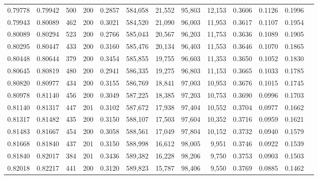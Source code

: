 \begin{tabular}{rrrrrrrrrrrrr}
0.79778 & 0.79942 &   500 & 200 &                                     0.2857 & 584,058 &  21,552 &  95,803 &  12,153 & 0.3606 & 0.1126 & 0.1996 \\
0.79943 & 0.80089 &   462 & 200 &                                     0.3021 & 584,520 &  21,090 &  96,003 &  11,953 & 0.3617 & 0.1107 & 0.1954 \\
0.80089 & 0.80294 &   523 & 200 &                                     0.2766 & 585,043 &  20,567 &  96,203 &  11,753 & 0.3636 & 0.1089 & 0.1905 \\
0.80295 & 0.80447 &   433 & 200 &                                     0.3160 & 585,476 &  20,134 &  96,403 &  11,553 & 0.3646 & 0.1070 & 0.1865 \\
0.80448 & 0.80644 &   379 & 200 &                                     0.3454 & 585,855 &  19,755 &  96,603 &  11,353 & 0.3650 & 0.1052 & 0.1830 \\
0.80645 & 0.80819 &   480 & 200 &                                     0.2941 & 586,335 &  19,275 &  96,803 &  11,153 & 0.3665 & 0.1033 & 0.1785 \\
0.80820 & 0.80977 &   434 & 200 &                                     0.3155 & 586,769 &  18,841 &  97,003 &  10,953 & 0.3676 & 0.1015 & 0.1745 \\
0.80978 & 0.81140 &   456 & 200 &                                     0.3049 & 587,225 &  18,385 &  97,203 &  10,753 & 0.3690 & 0.0996 & 0.1703 \\
0.81140 & 0.81317 &   447 & 201 &                                     0.3102 & 587,672 &  17,938 &  97,404 &  10,552 & 0.3704 & 0.0977 & 0.1662 \\
0.81317 & 0.81482 &   435 & 200 &                                     0.3150 & 588,107 &  17,503 &  97,604 &  10,352 & 0.3716 & 0.0959 & 0.1621 \\
0.81483 & 0.81667 &   454 & 200 &                                     0.3058 & 588,561 &  17,049 &  97,804 &  10,152 & 0.3732 & 0.0940 & 0.1579 \\
0.81668 & 0.81840 &   437 & 201 &                                     0.3150 & 588,998 &  16,612 &  98,005 &   9,951 & 0.3746 & 0.0922 & 0.1539 \\
0.81840 & 0.82017 &   384 & 201 &                                     0.3436 & 589,382 &  16,228 &  98,206 &   9,750 & 0.3753 & 0.0903 & 0.1503 \\
0.82018 & 0.82217 &   441 & 200 &                                     0.3120 & 589,823 &  15,787 &  98,406 &   9,550 & 0.3769 & 0.0885 & 0.1462 \\

\end{tabular}
